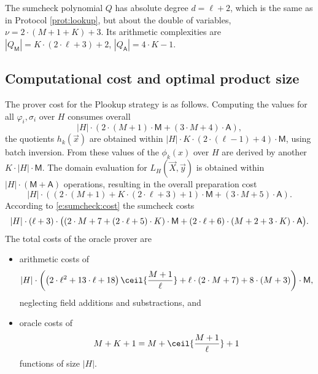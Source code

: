 \documentclass[11pt]{article}
\theoremstyle{definition}
\theoremstyle{definition}
\begin{document}
The sumcheck polynomial $Q$ has  absolute degree $d = \ell + 2$, which is the same as in Protocol \ref{prot:lookup}, but  about the double of variables, $\nu = 2\cdot (M+1 + K) + 3$.
Its arithmetic complexities are $|Q_\mathsf M|= K\cdot (2\cdot \ell + 3) + 2$, $|Q_\mathsf A|= 4\cdot K - 1$. 

\subsection{Computational cost and optimal product size}

The prover cost for the Plookup strategy is as follows.
Computing the values for all $\varphi_i,  \sigma_i$ over $H$ consumes overall
\[
|H|\cdot (2\cdot(M+1)\cdot \mathsf M + (3\cdot M+ 4)\cdot \mathsf A),
\]
the quotients $h_k(\vec x)$ are obtained within $|H|\cdot K\cdot (2\cdot(\ell-1) + 4)\cdot \mathsf M$, using batch inversion.
From these values of the $\phi_k(x)$ over $H$ are derived by another  $K\cdot |H|\cdot \mathsf M$.
The domain evaluation for $L_H(\vec X, \vec y)$ is obtained within $|H|\cdot (\mathsf M + \mathsf A)$ operations,
 resulting in the overall preparation cost
\begin{equation}
\label{e:plookup:prep:cost}
|H|\cdot ( (2\cdot(M+1)  + K\cdot  (2\cdot \ell + 3)+1)\cdot \mathsf M + (3 \cdot M+ 5)\cdot \mathsf A).
\end{equation}
According to \eqref{e:sumcheck:cost} the sumcheck costs
\begin{equation}
\label{e:plookup:sumcheck:cost}
|H| \cdot  (\ell + 3)\cdot \big((2\cdot M + 7 + (2\cdot\ell +5)\cdot K)\cdot \mathsf M +  (2\cdot\ell + 6)\cdot (M + 2 + 3\cdot K) \cdot \textsf A\big).
\end{equation}
The total costs of the oracle prover are 
\begin{itemize}
\item
arithmetic costs of
\begin{equation}
\label{e:lookup:cost}
|H| \cdot \left( \left(2\cdot \ell ^2+13\cdot \ell+18\right) \ceil{\frac{M+1}{\ell}} +\ell\cdot (2\cdot M+7)+8\cdot (M+3) \right) \cdot \mathsf M,
\end{equation}
neglecting field additions and substractions, and
\item 
oracle costs of 
\begin{equation}
M + K+1 =  M + \ceil{\frac{M+1}{\ell}} + 1
\end{equation} 
functions of size $|H|$.
\end{itemize}
\end{document}
